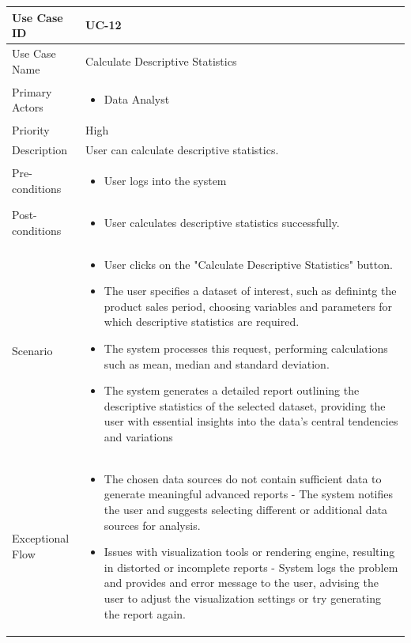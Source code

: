\vspace{12pt}

\begin{tabularx}{\textwidth}{|l|X|}
\hline
Use Case ID & UC-12 \\
\hline
Use Case Name & Calculate Descriptive Statistics\\
\hline
Primary Actors & 
\begin{itemize}
    \item Data Analyst
\end{itemize} \\
\hline
Priority & High \\
\hline
Description & User can calculate descriptive statistics. \\
\hline
Pre-conditions & 
\begin{itemize}
    \item User logs into the system
\end{itemize} \\
\hline
Post-conditions & 
\begin{itemize}
    \item User calculates descriptive statistics successfully.
\end{itemize} \\
\hline
Scenario & 
\begin{itemize}
    \item User clicks on the "Calculate Descriptive Statistics" button. 
    \item The user specifies a dataset of interest, such as definintg the product sales period, choosing variables and parameters for which descriptive statistics are required.
    \item The system processes this request, performing calculations such as mean, median and standard deviation.
    \item The system generates a detailed report outlining the descriptive statistics of the selected dataset, providing the user with essential insights into the data's central tendencies and variations
\end{itemize}\\
\hline
Exceptional Flow & 
\begin{itemize}
    \item The chosen data sources do not contain sufficient data to generate meaningful advanced reports - The system notifies the user and suggests selecting different or additional data sources for analysis.
    \item Issues with visualization tools or rendering engine, resulting in distorted or incomplete reports - System logs the problem and provides and error message to the user, advising the user to adjust the visualization settings or try generating the report again.
\end{itemize}\\
\hline
\end{tabularx}